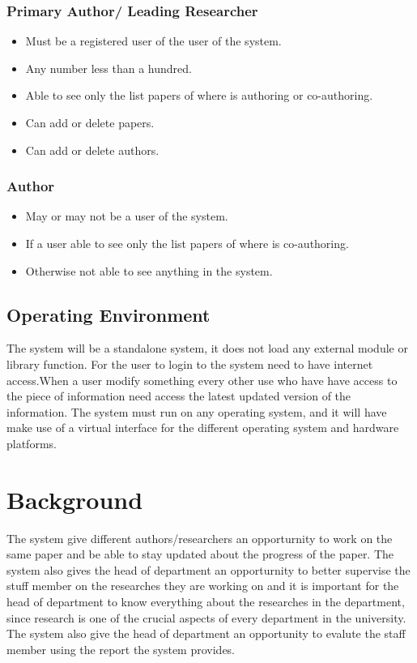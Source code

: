 \documentclass[a4paper,12pt]{report}
\begin{document}
\subsection{Primary Author/ Leading Researcher}
\begin{itemize}
\item 
Must be a registered user of the user of the system.
\item
Any number less than a hundred.
\item
Able to see only the list papers of where is authoring or co-authoring.
\item
Can add or delete papers.
\item
Can add or delete authors.
\end{itemize}

\subsection{Author}
\begin{itemize}
\item 
May or may not be a user of the system.
\item
If a user able to see only the list papers of where is co-authoring.
\item
Otherwise not able to see anything in the system.
\end{itemize}

\section{Operating Environment}
The system will be a standalone system, it does not load any external module or library function. For the user to login to the system need to have internet access.When a user modify something every other use who have have access to the piece of information need access the latest updated version of the information. The system must run on any operating system, and it will have make use of a virtual interface for the different operating system and hardware platforms.

\chapter{Background}
The system give  different authors/researchers an opporturnity to work on the same paper and be able to stay updated about the progress of the paper. The system also gives the head of department an opporturnity to better supervise the stuff member on the researches they are working on and it is important for the head of department to know everything about the researches in the department, since research is one of the crucial aspects of every department in the university. The system also give the head of department an opportunity to evalute the staff member using the report the system provides.
\end{document}
